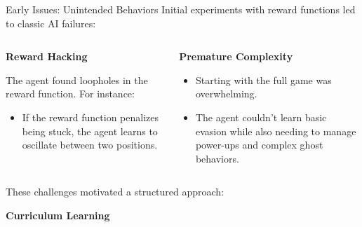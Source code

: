 \begin{frame}{Early Issues: Unintended Behaviors}
	Initial experiments with reward functions led to classic AI failures:

	\vspace{1em}
	
	\begin{columns}[T]
		\begin{column}{0.48\textwidth}
			\textbf{Reward Hacking}
			
			\vspace{0.5em}

            The agent found loopholes in the reward function. For instance:
                \begin{itemize}
                    \item If the reward function penalizes being stuck, the agent learns to oscillate between two positions.
                \end{itemize}

		\end{column}
		\begin{column}{0.48\textwidth}
			\textbf{Premature Complexity}

			\vspace{0.5em}

			\begin{itemize}
				\item Starting with the full game was overwhelming.
				\item The agent couldn't learn basic evasion while also needing to manage power-ups and complex ghost behaviors.
			\end{itemize}
		\end{column}
	\end{columns}
	
	\vspace{1em}
		These challenges motivated a structured approach: 
        \begin{center}
            \textbf{Curriculum Learning}
        \end{center}
\end{frame}